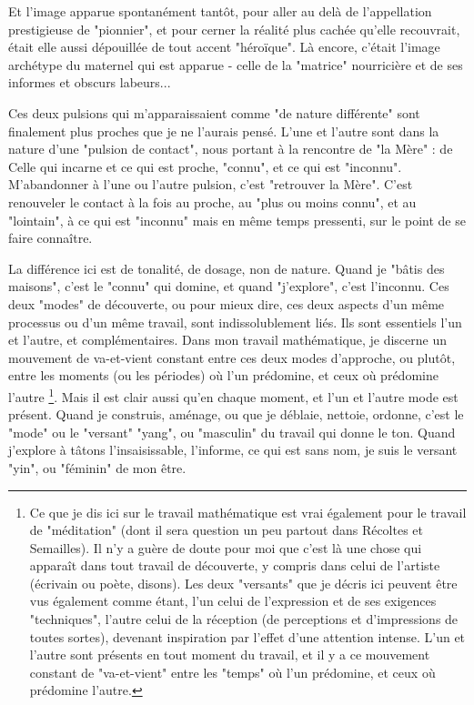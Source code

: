 Et l'image apparue spontanément tantôt, pour aller au delà de l'appellation prestigieuse de "pionnier", et pour cerner la réalité plus cachée qu'elle recouvrait, était elle aussi dépouillée de tout accent "héroïque". Là encore, c'était l'image archétype du maternel qui est apparue - celle de la "matrice" nourricière et de ses informes et obscurs labeurs...

Ces deux pulsions qui m'apparaissaient comme "de nature différente" sont finalement plus proches que je ne l'aurais pensé. L'une et l'autre sont dans la nature d'une "pulsion de contact", nous portant à la rencontre de "la Mère" : de Celle qui incarne et ce qui est proche, "connu", et ce qui est "inconnu". M'abandonner à l'une ou l'autre pulsion, c'est "retrouver la Mère". C'est renouveler le contact à la fois au proche, au "plus ou moins connu", et au "lointain", à ce qui est "inconnu" mais en même temps pressenti, sur le point de se faire connaître.

La différence ici est de tonalité, de dosage, non de nature. Quand je "bâtis des maisons", c'est le "connu" qui domine, et quand "j'explore", c'est l'inconnu. Ces deux "modes" de découverte, ou pour mieux dire, ces deux aspects d'un même processus ou d'un même travail, sont indissolublement liés. Ils sont essentiels l'un et l'autre, et complémentaires. Dans mon travail mathématique, je discerne un mouvement de va-et-vient constant entre ces deux modes d'approche, ou plutôt, entre les moments (ou les périodes) où l'un prédomine, et ceux où prédomine l'autre \footnote{Ce que je dis ici sur le travail mathématique est vrai également pour le travail de "méditation" (dont il sera question un peu partout dans Récoltes et Semailles). Il n'y a guère de doute pour moi que c'est là une chose qui apparaît dans tout travail de découverte, y compris dans celui de l'artiste (écrivain ou poète, disons). Les deux "versants" que je décris ici peuvent être vus également comme étant, l'un celui de l'expression et de ses exigences "techniques", l'autre celui de la réception (de perceptions et d'impressions de toutes sortes), devenant inspiration par l'effet d'une attention intense. L'un et l'autre sont présents en tout moment du travail, et il y a ce mouvement constant de "va-et-vient" entre les "temps" où l'un prédomine, et ceux où prédomine l'autre.}. Mais il est clair aussi qu’en chaque moment, et l’un et l’autre mode est présent. Quand je construis, aménage, ou que je déblaie, nettoie, ordonne, c'est le "mode" ou le "versant" "yang", ou "masculin" du travail qui donne le ton. Quand j'explore à tâtons l'insaisissable, l'informe, ce qui est sans nom, je suis le versant "yin", ou "féminin" de mon être.

